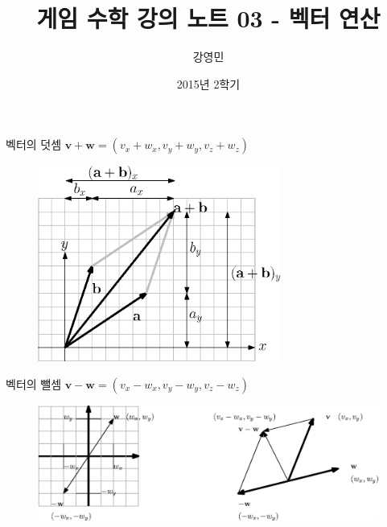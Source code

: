 \documentclass{beamer}
\title[게임수학 - 벡터연산]{ 게임 수학 강의 노트 03 - 벡터 연산}
\author{강영민}
\institute{동명대학교}
\date{2015년 2학기}
\begin{document}
\begin{frame}
  \titlepage
\end{frame}



\begin{frame}{벡터의 덧셈}
$\mathbf v + \mathbf w = (v_x + w_x, v_y + w_y , v_z + w_z )$
\begin{figure}
\includegraphics[width=8cm]{Math_vector/vectorAdd.eps}
\end{figure}
\end{frame}

\begin{frame}{벡터의 뺄셈}
$\mathbf v - \mathbf w = (v_x - w_x, v_y - w_y , v_z - w_z )$
\\

\begin{figure}
\includegraphics[width=12cm]{Math_vector/vectorSub.eps}
\end{figure}
\end{frame}
\end{document}
